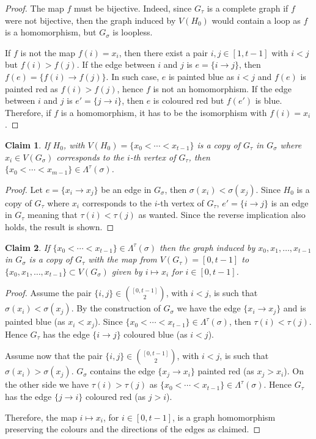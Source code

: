 \documentclass[10pt]{article}
\newtheorem{claim}{Claim}
\begin{document}
\begin{proof}
	The map $f$ must be bijective. Indeed, since $G_{\tau}$ is a complete graph
if $f$ were not bijective, then the graph induced by $V(H_0)$ would contain a loop as $f$ is a homomorphism, but $G_{\sigma}$ is loopless.

If $f$ is not the map $f(i)=x_i$, then there exist a pair $i,j\in[1,t-1]$ with $i<j$ but $f(i)>f(j)$. If the edge between $i$ and $j$ is $e=\{i\to j\}$, then
$f(e)=\{f(i)\to f(j)\}$. In such case, $e$ is painted blue as $i<j$ and $f(e)$ is painted red as $f(i)>f(j)$, hence $f$ is not an homomorphism. If the edge between $i$ and $j$ is $e'=\{j\to i\}$, then $e$ is coloured red but $f(e')$ is blue. Therefore, if $f$ is a homomorphism, it has to be the isomorphism with $f(i)=x_i$.
\end{proof}

\begin{claim}\label{cl.1}
	If $H_0$, with $V(H_0)=\{x_0<\cdots<x_{t-1}\}$ is a copy of
$G_{\tau}$ in $G_{\sigma}$ where $x_i\in V(G_{\sigma})$ corresponds to the $i$-th vertex of $G_{\tau}$, then $\{x_0<\cdots <x_{m-1}\}\in \Lambda^{\tau}(\sigma)$.
\end{claim}


\begin{proof}
	Let $e=\{x_i\to x_j\}$ be an edge in $G_{\sigma}$, then $\sigma(x_i)<\sigma(x_j)$. Since $H_0$ is a copy of $G_{\tau}$ where $x_i$ corresponds to the $i$-th vertex of $G_{\tau}$,  $e'=\{i\to j\}$ is an edge in $G_{\tau}$ meaning that $\tau(i)<\tau(j)$ as wanted. Since the reverse implication also holds, the result is shown.
\end{proof}



\begin{claim}\label{cl.2}
	If $\{x_0<\cdots <x_{t-1}\}\in \Lambda^{\tau}(\sigma)$ then the graph induced by $x_0,x_1,\ldots,x_{t-1}$ in $G_{\sigma}$ is a copy of $G_{\tau}$
with the map from $V(G_{\tau})=[0,t-1]$ to $\{x_0,x_1,\ldots,x_{t-1}\}\subset V(G_{\sigma})$ given by $i\mapsto x_i$ for $i\in[0,t-1]$.
\end{claim}


\begin{proof}
Assume the pair $\{i,j\}\in {[0,t-1]\choose 2}$, with $i<j$, is such that $\sigma(x_i)<\sigma(x_j)$. By the construction of $G_{\sigma}$
we have the edge $\{x_i\to x_j\}$ and is painted blue (as $x_i<x_j$).
Since $\{x_0<\cdots <x_{t-1}\}\in \Lambda^{\tau}(\sigma)$, then $\tau(i)<\tau(j)$. Hence $G_\tau$ has the edge $\{i\to j\}$ coloured blue (as $i<j$).

Assume now that the pair $\{i,j\}\in {[0,t-1]\choose 2}$, with $i<j$, is such that $\sigma(x_i)>\sigma(x_j)$. $G_{\sigma}$ contains the edge $\{x_j\to x_i\}$ painted red (as $x_j>x_i$). On the other side we have $\tau(i)>\tau(j)$ as $\{x_0<\cdots <x_{t-1}\}\in \Lambda^{\tau}(\sigma)$.  Hence $G_\tau$ has the edge $\{j\to i\}$ coloured red (as $j>i$).

Therefore, the map $i\mapsto x_i$, for $i\in[0,t-1]$, is a graph homomorphism preserving the colours and the directions of the edges as claimed.
\end{proof}
\end{document}
